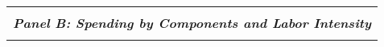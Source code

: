 \begin{tabular}{lccccc}
    \cmidrule{1-6}
    \vspace{-1.5pt} & \vspace{-1.5pt} & \vspace{-1.5pt} & \vspace{-1.5pt} & \vspace{-1.5pt} \\
    \multicolumn{6}{c}{\textit{\textbf{Panel B: Spending by Components and Labor Intensity}}} \\ 
    \vspace{-1.5pt} & \vspace{-1.5pt} & \vspace{-1.5pt} & \vspace{-1.5pt} & \vspace{-1.5pt} \\


\end{tabular}
